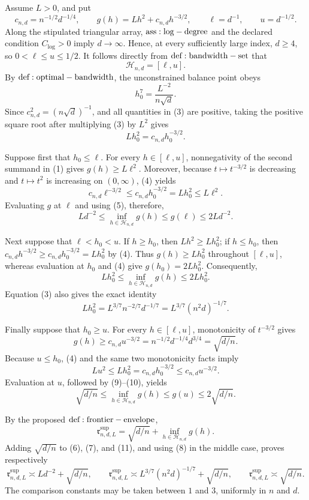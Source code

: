 Assume \(L>0\), and put
\[
 c_{n,d}=n^{-1/2}d^{-1/4},\qquad
 g(h)=Lh^2+c_{n,d}h^{-3/2},\qquad
 \ell=d^{-1},\qquad u=d^{-1/2}.
\tag{1}
\]
Along the stipulated triangular array, \({\rm ass:log-degree}\) and the declared condition \(C_{\log}>0\) imply \(d\to\infty\).  Hence, at every sufficiently large index, \(d\geq4\), so \(0<\ell\leq u\leq1/2\).  It follows directly from \({\rm def:bandwidth-set}\) that
\[
 \mathcal H_{n,d}=[\ell,u].
\tag{2}
\]
By \({\rm def:optimal-bandwidth}\), the unconstrained balance point obeys
\[
 h_0^7=\frac{L^{-2}}{n\sqrt d}.
\tag{3}
\]
Since \(c_{n,d}^2=(n\sqrt d)^{-1}\), and all quantities in (3) are positive, taking the positive square root after multiplying (3) by \(L^2\) gives
\[
 Lh_0^2=c_{n,d}h_0^{-3/2}.
\tag{4}
\]

Suppose first that \(h_0\leq\ell\).  For every \(h\in[\ell,u]\), nonnegativity of the second summand in (1) gives \(g(h)\geq L\ell^2\).  Moreover, because \(t\mapsto t^{-3/2}\) is decreasing and \(t\mapsto t^2\) is increasing on \((0,\infty)\), (4) yields
\[
 c_{n,d}\ell^{-3/2}
 \leq c_{n,d}h_0^{-3/2}
 =Lh_0^2
 \leq L\ell^2.
\tag{5}
\]
Evaluating \(g\) at \(\ell\) and using (5), therefore,
\[
 Ld^{-2}
 \leq \inf_{h\in\mathcal H_{n,d}}g(h)
 \leq g(\ell)
 \leq2Ld^{-2}.
\tag{6}
\]

Next suppose that \(\ell<h_0<u\).  If \(h\geq h_0\), then \(Lh^2\geq Lh_0^2\); if \(h\leq h_0\), then \(c_{n,d}h^{-3/2}\geq c_{n,d}h_0^{-3/2}=Lh_0^2\) by (4).  Thus \(g(h)\geq Lh_0^2\) throughout \([\ell,u]\), whereas evaluation at \(h_0\) and (4) give \(g(h_0)=2Lh_0^2\).  Consequently,
\[
 Lh_0^2
 \leq \inf_{h\in\mathcal H_{n,d}}g(h)
 \leq2Lh_0^2.
\tag{7}
\]
Equation (3) also gives the exact identity
\[
 Lh_0^2=L^{3/7}n^{-2/7}d^{-1/7}
 =L^{3/7}(n^2d)^{-1/7}.
\tag{8}
\]

Finally suppose that \(h_0\geq u\).  For every \(h\in[\ell,u]\), monotonicity of \(t^{-3/2}\) gives
\[
 g(h)\geq c_{n,d}u^{-3/2}
 =n^{-1/2}d^{-1/4}d^{3/4}
 =\sqrt{d/n}.
\tag{9}
\]
Because \(u\leq h_0\), (4) and the same two monotonicity facts imply
\[
 Lu^2\leq Lh_0^2=c_{n,d}h_0^{-3/2}
 \leq c_{n,d}u^{-3/2}.
\tag{10}
\]
Evaluation at \(u\), followed by (9)--(10), yields
\[
 \sqrt{d/n}
 \leq \inf_{h\in\mathcal H_{n,d}}g(h)
 \leq g(u)
 \leq2\sqrt{d/n}.
\tag{11}
\]

By the proposed \({\rm def:frontier-envelope}\),
\[
 \mathfrak r^{\mathrm{sup}}_{n,d,L}
 =\sqrt{d/n}+\inf_{h\in\mathcal H_{n,d}}g(h).
\tag{12}
\]
Adding \(\sqrt{d/n}\) to (6), (7), and (11), and using (8) in the middle case, proves respectively
\[
 \mathfrak r^{\mathrm{sup}}_{n,d,L}
 \asymp Ld^{-2}+\sqrt{d/n},
 \qquad
 \mathfrak r^{\mathrm{sup}}_{n,d,L}
 \asymp L^{3/7}(n^2d)^{-1/7}+\sqrt{d/n},
 \qquad
 \mathfrak r^{\mathrm{sup}}_{n,d,L}\asymp\sqrt{d/n}.
\tag{13}
\]
The comparison constants may be taken between \(1\) and \(3\), uniformly in \(n\) and \(d\).

